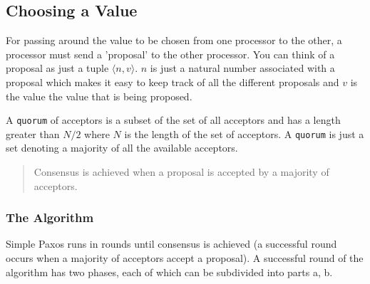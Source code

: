 \vspace{-4mm}
\subsection{Choosing a Value}
For passing around the value to be chosen from one processor to the other,
a processor must send a 'proposal' to the other processor.
You can think of a proposal as just a tuple $\langle n, v \rangle$.
$n$ is just a natural number associated with a proposal which makes
it easy to keep track of all the different proposals and $v$ is the value
the value that is being proposed.

A \texttt{quorum} of acceptors is a subset of the set of all acceptors
and has a length greater
than $N / 2$ where $N$ is the length of the set of acceptors. A \texttt{quorum} is just
a set denoting a majority of all the available acceptors.

\begin{quote}
Consensus is achieved when a proposal is accepted by a majority of acceptors.
\end{quote}

\vspace{-4mm}
\subsubsection{The Algorithm}
Simple Paxos runs in rounds until consensus is achieved (a successful round
occurs when a majority of acceptors accept a proposal).
A successful round of the algorithm has two phases, each of which can
be subdivided into parts a, b.

